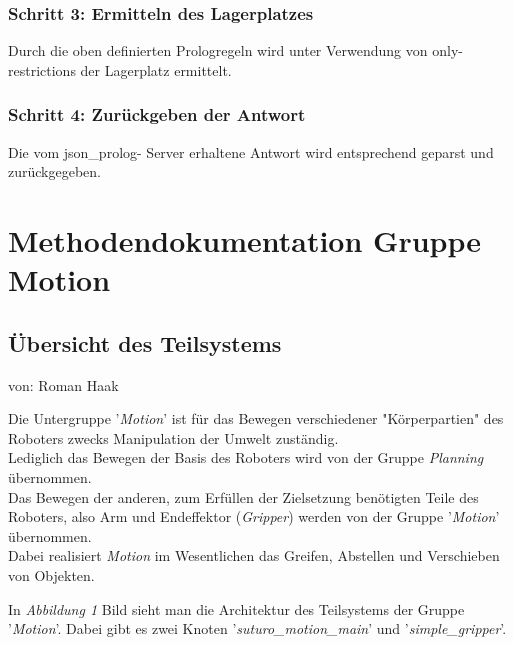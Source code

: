 \documentclass{suturo}
\makeatletter
\newcommand{\chapterauthor}[1]{%
  {\parindent0pt\vspace*{-27pt}%
  \linespread{0}\small\begin{flushright}von: #1\end{flushright}%
  \par\nobreak\vspace*{0pt}}
  \@afterheading%
}
\makeatother
\begin{document}
\subsubsection{Schritt 3: Ermitteln des Lagerplatzes} 
Durch die oben definierten Prologregeln wird unter Verwendung von only- restrictions der Lagerplatz ermittelt.
\subsubsection{Schritt 4: Zurückgeben der Antwort}
Die vom json\_prolog- Server erhaltene Antwort wird entsprechend geparst und zurückgegeben.

\newpage

\section*{Methodendokumentation Gruppe Motion}

\subsection{Übersicht des Teilsystems}
\chapterauthor{Roman Haak}
Die Untergruppe '\textit{Motion}' ist für das Bewegen verschiedener "Körperpartien" des Roboters zwecks Manipulation der Umwelt zuständig.\\
Lediglich das Bewegen der Basis des Roboters wird von der Gruppe \textit{Planning} übernommen.\\
Das Bewegen der anderen, zum Erfüllen der Zielsetzung benötigten Teile des Roboters, also Arm und Endeffektor (\textit{Gripper}) werden 
von der Gruppe '\textit{Motion}' übernommen.\\
Dabei realisiert \textit{Motion} im Wesentlichen das Greifen, Abstellen und Verschieben von Objekten.

In \textit{Abbildung 1} Bild sieht man die Architektur des Teilsystems der Gruppe '\textit{Motion}'. Dabei gibt es zwei Knoten '\textit{suturo\_motion\_main}' und '\textit{simple\_gripper}'.\\

\begin{figure}[!htb]
\end{figure}
\end{document}
